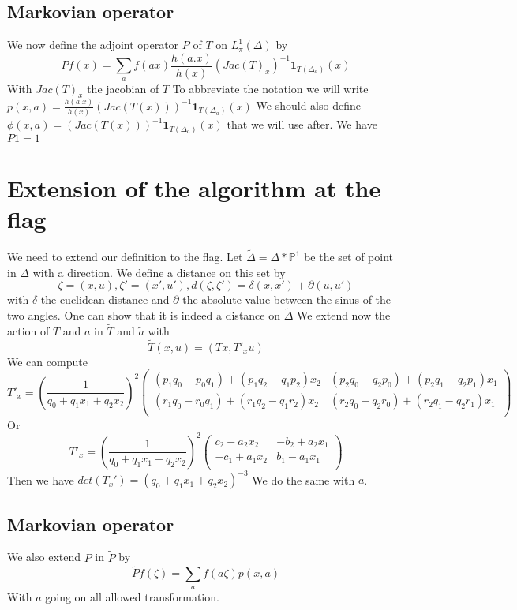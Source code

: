 \documentclass[12pt]{article}
\theoremstyle{plain}%
\theoremstyle{definition}
\theoremstyle{remark}
\begin{document}
\subsection{Markovian operator}
We now define the adjoint operator $P$ of $T$ on $L^1_{\pi}(\Delta)$ by \[
Pf(x)=\sum_{a} f(a x)\frac{h(a.x)}{h(x)}(Jac(T)_x)^{-1} \mathbf{1} _{T(\Delta_a)}(x)
\]
With $Jac(T)_x$ the jacobian of $T$\newline
To abbreviate the notation we will write $p(x,a)=\frac{h(a.x)}{h(x)}(Jac(T(x)))^{-1} \mathbf{1}_{T(\Delta_a)}(x)$\newline
We should also define $\phi(x,a)=(Jac(T(x)))^{-1} \mathbf{1}_{T(\Delta_a)}(x)$ that we will use after. \newline
We have $P1=1$

\section{Extension of the algorithm at the flag}
We need to extend our definition to the flag. Let $\tilde{\Delta}=\Delta*\mathbb{P}^1$ be the set of point in $\Delta$ with a direction. We define a distance on this set by \[
\zeta=(x,u),\zeta'=(x',u'),d(\zeta,\zeta')=\delta(x,x')+\partial (u,u')
\]
with $\delta$ the euclidean distance and $\partial$ the absolute value between the sinus of the two angles.
One can show that it is indeed a distance on $\tilde{\Delta}$\newline
We extend now the action of $T$ and $a$ in $\tilde{T}$ and $\tilde{a}$ with\[
\tilde{T}(x,u)=(Tx,T'_x u)
\]
We can compute \[
T'_x=(\frac{1}{q_0+q_1 x_1 + q_2 x_2})^2 \begin{pmatrix}
(p_1 q_0 - p_0 q_1)+(p_1 q_2-q_1 p_2)x_2 & (p_2 q_0-q_2 p_0)+(p_2 q_1 -q_2 p_1) x_1 \\
(r_1 q_0 - r_0 q_1)+(r_1 q_2-q_1 r_2)x_2 & (r_2 q_0-q_2 r_0)+(r_2 q_1 -q_2 r_1) x_1 \\
\end{pmatrix}
\]
Or \[
T'_x = (\frac{1}{q_0+q_1 x_1 + q_2 x_2})^2 \begin{pmatrix}
c_2-a_2 x_2 & -b_2+a_2 x_1 \\
-c_1+a_1 x_2 & b_1 - a_1 x_1 \\
\end{pmatrix}
\]
Then we have $det(T_x')= (q_0+q_1 x_1 + q_2 x_2)^{-3}$ \newline
We do the same with $a$.
\subsection{Markovian operator}
We also extend $P$ in $\tilde{P}$ by \[
\tilde{P}f(\zeta)=\sum_a f(a \zeta) p(x,a)
\]
With $a$ going on all allowed transformation.
\end{document}
